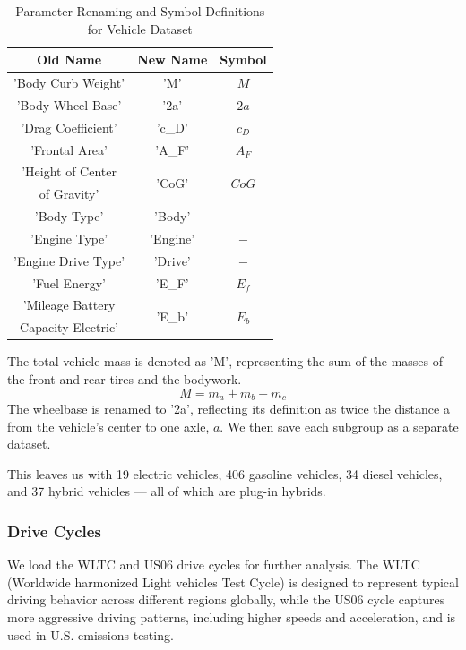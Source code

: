 	\begin{table}[H]
		\begin{center}
			\begin{tabular}{c | c | c}
					\hline
					\hline
			    Old Name & New Name & Symbol \\ 
				    \hline 
				    \hline
    			'Body Curb Weight' & 'M' & $M$ \\ 
	    			\hline
			    'Body Wheel Base' & '2a' & $2a$ \\
			    'Drag Coefficient' & 'c\_D' & $c_D$\\
			    'Frontal Area' & 'A\_F' & $A_F$ \\
			    'Height of Center & \multirow{2}{*}{'CoG'} & \multirow{2}{*}{$CoG$} \\
	    		of Gravity' & & \\
				    \hline
		    	'Body Type' & 'Body' & $-$ \\
	    		'Engine Type' & 'Engine' & $-$ \\
   				'Engine Drive Type' & 'Drive' & $-$ \\
	    			\hline
		    	'Fuel Energy' & 'E\_F' & $E_f$\\
		    	'Mileage Battery & \multirow{2}{*}{'E\_b'} & \multirow{2}{*}{$E_b$} \\
	    		Capacity Electric' & \\
    			\hline
    			\hline
			\end{tabular}
		\end{center}
		\caption{Parameter Renaming and Symbol Definitions for Vehicle Dataset}
	\end{table}
	The total vehicle mass is denoted as 'M', representing the sum of the masses of the front and rear tires and the bodywork. 
	\begin{equation*}
		M = m_a + m_b + m_c
	\end{equation*}
	The wheelbase is renamed to '2a', reflecting its definition as twice the distance a from the vehicle’s center to one axle, $a$. We then save each subgroup as a separate dataset. 
	
	This leaves us with 19 electric vehicles, 406 gasoline vehicles, 34 diesel vehicles, and 37 hybrid vehicles — all of which are plug-in hybrids.
	
\subsubsection*{Drive Cycles}
	We load the WLTC and US06 drive cycles for further analysis. The WLTC (Worldwide harmonized Light vehicles Test Cycle) is designed to represent typical driving behavior across different regions globally, while the US06 cycle captures more aggressive driving patterns, including higher speeds and acceleration, and is used in U.S. emissions testing.
	
